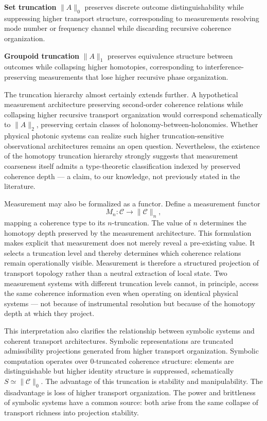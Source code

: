 \documentclass[11pt,openany]{book}
\theoremstyle{definition}
\theoremstyle{plain}
\begin{document}
\textbf{Set truncation} $\|A\|_0$ preserves discrete outcome distinguishability while suppressing higher transport structure, corresponding to measurements resolving mode number or frequency channel while discarding recursive coherence organization.

\textbf{Groupoid truncation} $\|A\|_1$ preserves equivalence structure between outcomes while collapsing higher homotopies, corresponding to interference-preserving measurements that lose higher recursive phase organization.

The truncation hierarchy almost certainly extends further. A hypothetical measurement architecture preserving second-order coherence relations while collapsing higher recursive transport organization would correspond schematically to $\|A\|_2$, preserving certain classes of holonomy-between-holonomies. Whether physical photonic systems can realize such higher truncation-sensitive observational architectures remains an open question. Nevertheless, the existence of the homotopy truncation hierarchy strongly suggests that measurement coarseness itself admits a type-theoretic classification indexed by preserved coherence depth --- a claim, to our knowledge, not previously stated in the literature.

Measurement may also be formalized as a functor. Define a measurement functor
\[
M_n : \mathcal{C} \to \|\mathcal{C}\|_n,
\]
mapping a coherence type to its $n$-truncation. The value of $n$ determines the homotopy depth preserved by the measurement architecture. This formulation makes explicit that measurement does not merely reveal a pre-existing value. It selects a truncation level and thereby determines which coherence relations remain operationally visible. Measurement is therefore a structured projection of transport topology rather than a neutral extraction of local state. Two measurement systems with different truncation levels cannot, in principle, access the same coherence information even when operating on identical physical systems --- not because of instrumental resolution but because of the homotopy depth at which they project.

This interpretation also clarifies the relationship between symbolic systems and coherent transport architectures. Symbolic representations are truncated admissibility projections generated from higher transport organization. Symbolic computation operates over $0$-truncated coherence structure: elements are distinguishable but higher identity structure is suppressed, schematically $S \simeq \|\mathcal{C}\|_0$. The advantage of this truncation is stability and manipulability. The disadvantage is loss of higher transport organization. The power and brittleness of symbolic systems have a common source: both arise from the same collapse of transport richness into projection stability.
\end{document}
